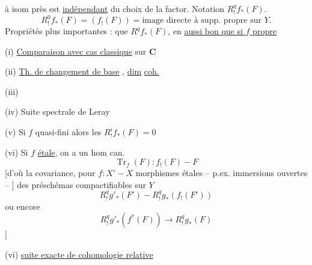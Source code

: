 à isom près est \uline{indépendant} du choix de la factor. Notation $R^q_!f_*(F)$.
\[
R^0_!f_*(F)=(f_!(F))=\text{image directe à supp. propre sur }Y.
\]
 Propriétés plus importantes :   que $R^qf_*(F)$, en \uline{aussi bon que si $f$ propre}

(i) \uline{Comparaison avec cas classique} sur $\mathbf C$

(ii) \uline{Th. de changement de base} , \uline{dim} \uline{coh.}

(iii)  

(iv) Suite spectrale de Leray

(v) Si $f$ quasi-fini  alors les $R^i_!f_*(F)=0$

(vi) Si $f$ \uline{étale}, on a un hom can.
\[
\operatorname{Tr}_f(F):f_!(F)\mathbin{-}F
\]
[d'où la covariance, pour $f:X'\mathbin{-}X$ morphismes étales -- p.ex. immersions ouvertes -- ] des préschémas compactifiables sur $Y$
\[
R^q_!g'_*(F')\mathbin{-}R^q_!g_*(f_!(F'))
\]
ou encore
\[
R^q_!g'_*(f^*(F))\longrightarrow R^q_!g_*(F)
\]
]

(vi) \uline{suite exacte de cohomologie relative}
